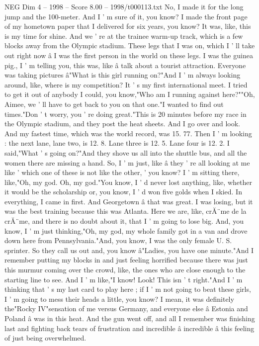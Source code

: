 \begin{textsample}{NEG Dim 4 – 1998 – Score 8.00 – 1998/t000113.txt}
No, I made it for the long jump and the 100-meter.
And I ' m sure of it, you know?
I made the front page of my hometown paper that I delivered for six years, you know?
It was, like, this is my time for shine.
And we ' re at the trainee warm-up track, which is a few blocks away from the Olympic stadium.
These legs that I was on, which I ' ll take out right now â I was the first person in the world on these legs.
I was the guinea pig., I ' m telling you, this was, like â talk about a tourist attraction.
Everyone was taking pictures â"What is this girl running on?"And I ' m always looking around, like, where is my competition?
It ' s my first international meet.
I tried to get it out of anybody I could, you know,"Who am I running against here?""Oh, Aimee, we ' ll have to get back to you on that one."I wanted to find out times."Don ' t worry, you ' re doing great."This is 20 minutes before my race in the Olympic stadium, and they post the heat sheets.
And I go over and look.
And my fastest time, which was the world record, was 15. 77.
Then I ' m looking : the next lane, lane two, is 12. 8.
Lane three is 12. 5.
Lane four is 12. 2.
I said,"What ' s going on?"And they shove us all into the shuttle bus, and all the women there are missing a hand.
So, I ' m just, like â they ' re all looking at me like ' which one of these is not like the other, ' you know?
I ' m sitting there, like,"Oh, my god.
Oh, my god."You know, I ' d never lost anything, like, whether it would be the scholarship or, you know, I ' d won five golds when I skied.
In everything, I came in first.
And Georgetown â that was great.
I was losing, but it was the best training because this was Atlanta.
Here we are, like, crĂ¨me de la crĂ¨me, and there is no doubt about it, that I ' m going to lose big.
And, you know, I ' m just thinking,"Oh, my god, my whole family got in a van and drove down here from Pennsylvania."And, you know, I was the only female U.
S. sprinter.
So they call us out and, you know â"Ladies, you have one minute."And I remember putting my blocks in and just feeling horrified because there was just this murmur coming over the crowd, like, the ones who are close enough to the starting line to see.
And I ' m like,"I know!
Look!
This isn ' t right."And I ' m thinking that ' s my last card to play here ; if I ' m not going to beat these girls, I ' m going to mess their heads a little, you know?
I mean, it was definitely the"Rocky IV"sensation of me versus Germany, and everyone else â Estonia and Poland â was in this heat.
And the gun went off, and all I remember was finishing last and fighting back tears of frustration and incredible â incredible â this feeling of just being overwhelmed.

\end{textsample}
